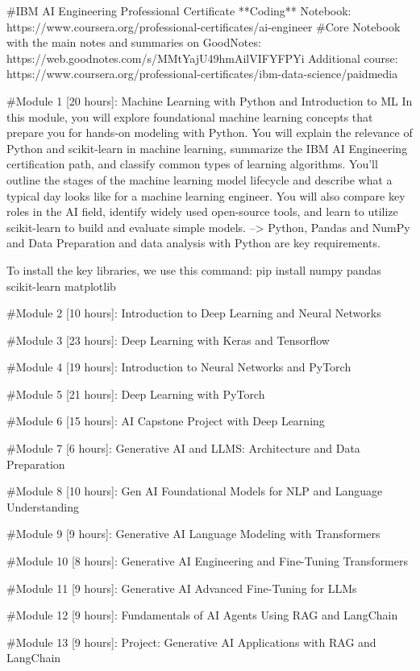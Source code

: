 #IBM AI Engineering Professional Certificate **Coding** Notebook: https://www.coursera.org/professional-certificates/ai-engineer
#Core Notebook with the main notes and summaries on GoodNotes: https://web.goodnotes.com/s/MMtYajU49hmAilVIFYFPYi
Additional course: https://www.coursera.org/professional-certificates/ibm-data-science/paidmedia



#Module 1 [20 hours]: Machine Learning with Python and Introduction to ML
In this module, you will explore foundational machine learning concepts that prepare you for hands-on modeling with Python. You will explain the relevance of Python and scikit-learn in machine learning, summarize the IBM AI Engineering certification path, and classify common types of learning algorithms. You’ll outline the stages of the machine learning model lifecycle and describe what a typical day looks like for a machine learning engineer. You will also compare key roles in the AI field, identify widely used open-source tools, and learn to utilize scikit-learn to build and evaluate simple models.
--> Python, Pandas and NumPy and Data Preparation and data analysis with Python are key requirements.

To install the key libraries, we use this command: pip install numpy pandas scikit-learn matplotlib

#Module 2 [10 hours]: Introduction to Deep Learning and Neural Networks

#Module 3 [23 hours]: Deep Learning with Keras and Tensorflow

#Module 4 [19 hours]: Introduction to Neural Networks and PyTorch

#Module 5 [21 hours]: Deep Learning with PyTorch

#Module 6 [15 hours]: AI Capstone Project with Deep Learning

#Module 7 [6 hours]: Generative AI and LLMS: Architecture and Data Preparation

#Module 8 [10 hours]: Gen AI Foundational Models for NLP and Language Understanding

#Module 9 [9 hours]: Generative AI Language Modeling with Transformers

#Module 10 [8 hours]: Generative AI Engineering and Fine-Tuning Transformers

#Module 11 [9 hours]: Generative AI Advanced Fine-Tuning for LLMs

#Module 12 [9 hours]: Fundamentals of AI Agents Using RAG and LangChain

#Module 13 [9 hours]: Project: Generative AI Applications with RAG and LangChain

